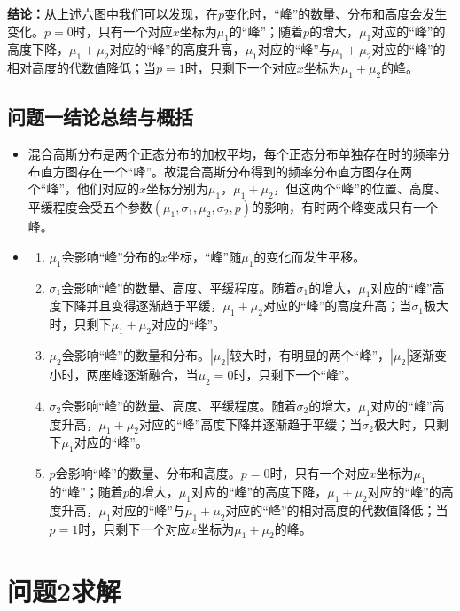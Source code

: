 \documentclass[CJK]{ctexart}
\begin{document}
\textbf{结论：}从上述六图中我们可以发现，在$p$变化时，“峰”的数量、分布和高度会发生变化。$p=0$时，只有一个对应$x$坐标为$\mu_1$的“峰”；随着$p$的增大，$\mu_1$对应的“峰”的高度下降，$\mu_1+\mu_2$对应的“峰”的高度升高，$\mu_1$对应的“峰”与$\mu_1+\mu_2$对应的“峰”的相对高度的代数值降低；当$p=1$时，只剩下一个对应$x$坐标为$\mu_1+\mu_2$的峰。

\subsection{问题一结论总结与概括}

\begin{itemize}
    \item 混合高斯分布是两个正态分布的加权平均，每个正态分布单独存在时的频率分布直方图存在一个“峰”。故混合高斯分布得到的频率分布直方图存在两个“峰”，他们对应的$x$坐标分别为$\mu_1$，$\mu_1+\mu_2$，但这两个“峰”的位置、高度、平缓程度会受五个参数$(\mu_1,\sigma_1,\mu_2,\sigma_2,p)$的影响，有时两个峰变成只有一个峰。
    \item {
        \begin{enumerate}
            \item $\mu_1$会影响“峰”分布的$x$坐标，“峰”随$\mu_1$的变化而发生平移。
            \item $\sigma_1$会影响“峰”的数量、高度、平缓程度。随着$\sigma_1$的增大，$\mu_1$对应的“峰”高度下降并且变得逐渐趋于平缓，$\mu_1+\mu_2$对应的“峰”的高度升高；当$\sigma_1$极大时，只剩下$\mu_1+\mu_2$对应的“峰”。
            \item $\mu_2$会影响“峰”的数量和分布。$|\mu_2|$较大时，有明显的两个“峰”，$|\mu_2|$逐渐变小时，两座峰逐渐融合，当$\mu_2=0$时，只剩下一个“峰”。
            \item $\sigma_2$会影响“峰”的数量、高度、平缓程度。随着$\sigma_2$的增大，$\mu_1$对应的“峰”高度升高，$\mu_1+\mu_2$对应的“峰”高度下降并逐渐趋于平缓；当$\sigma_2$极大时，只剩下$\mu_1$对应的“峰”。
            \item $p$会影响“峰”的数量、分布和高度。$p=0$时，只有一个对应$x$坐标为$\mu_1$的“峰”；随着$p$的增大，$\mu_1$对应的“峰”的高度下降，$\mu_1+\mu_2$对应的“峰”的高度升高，$\mu_1$对应的“峰”与$\mu_1+\mu_2$对应的“峰”的相对高度的代数值降低；当$p=1$时，只剩下一个对应$x$坐标为$\mu_1+\mu_2$的峰。
        \end{enumerate}
    }   
\end{itemize}

\section{问题2求解}
\end{document}
